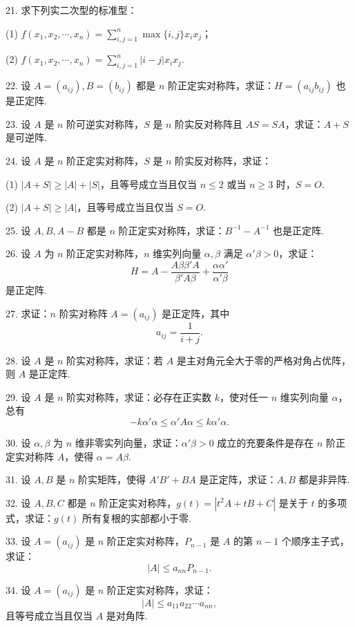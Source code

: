 \documentclass[UTF8,12pt,a4paper,fontset=fandol]{ctexart}
\begin{document}
21. 求下列实二次型的标准型：

(1) $f(x_1,x_2,\cdots,x_n)=\displaystyle\sum_{i,j=1}^n \max\{i,j\}x_ix_j$；

(2) $f(x_1,x_2,\cdots,x_n)=\displaystyle\sum_{i,j=1}^n |i-j|x_ix_j$.

22. 设 $A=(a_{ij}),B=(b_{ij})$ 都是 $n$ 阶正定实对称阵，求证：$H=(a_{ij}b_{ij})$ 也是正定阵.

23. 设 $A$ 是 $n$ 阶可逆实对称阵，$S$ 是 $n$ 阶实反对称阵且 $AS=SA$，求证：$A+S$ 是可逆阵.

24. 设 $A$ 是 $n$ 阶正定实对称阵，$S$ 是 $n$ 阶实反对称阵，求证：

(1) $|A+S|\geq |A|+|S|$，且等号成立当且仅当 $n\leq 2$ 或当 $n\geq 3$ 时，$S=O$.

(2) $|A+S|\geq |A|$，且等号成立当且仅当 $S=O$.

25. 设 $A,B,A-B$ 都是 $n$ 阶正定实对称阵，求证：$B^{-1}-A^{-1}$ 也是正定阵.

26. 设 $A$ 为 $n$ 阶正定实对称阵，$n$ 维实列向量 $\alpha,\beta$ 满足 $\alpha'\beta>0$，求证：
\[
H=A-\frac{A\beta\beta'A}{\beta'A\beta}+\frac{\alpha\alpha'}{\alpha'\beta}
\]
是正定阵.

27. 求证：$n$ 阶实对称阵 $A=(a_{ij})$ 是正定阵，其中
\[
a_{ij}=\frac{1}{i+j}.
\]

28. 设 $A$ 是 $n$ 阶实对称阵，求证：若 $A$ 是主对角元全大于零的严格对角占优阵，则 $A$ 是正定阵.

29. 设 $A$ 是 $n$ 阶实对称阵，求证：必存在正实数 $k$，使对任一 $n$ 维实列向量 $\alpha$，总有
\[
-k\alpha'\alpha\leq \alpha'A\alpha\leq k\alpha'\alpha.
\]

30. 设 $\alpha,\beta$ 为 $n$ 维非零实列向量，求证：$\alpha'\beta>0$ 成立的充要条件是存在 $n$ 阶正定实对称阵 $A$，使得 $\alpha=A\beta$.

31. 设 $A,B$ 是 $n$ 阶实矩阵，使得 $A'B'+BA$ 是正定阵，求证：$A,B$ 都是非异阵.

32. 设 $A,B,C$ 都是 $n$ 阶正定实对称阵，$g(t)=|t^2A+tB+C|$ 是关于 $t$ 的多项式，求证：$g(t)$ 所有复根的实部都小于零.

33. 设 $A=(a_{ij})$ 是 $n$ 阶正定实对称阵，$P_{n-1}$ 是 $A$ 的第 $n-1$ 个顺序主子式，求证：
\[
|A|\leq a_{nn}P_{n-1}.
\]

34. 设 $A=(a_{ij})$ 是 $n$ 阶正定实对称阵，求证：
\[
|A|\leq a_{11}a_{22}\cdots a_{nn},
\]
且等号成立当且仅当 $A$ 是对角阵.
\end{document}
